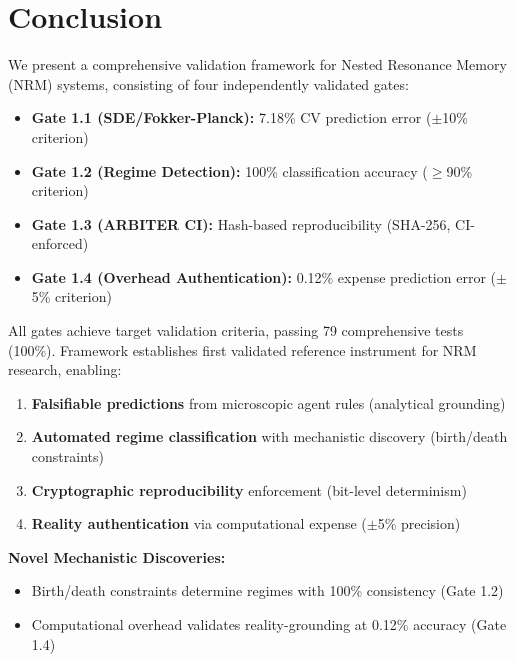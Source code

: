 \documentclass[11pt]{article}
\begin{document}

\section{Conclusion}

We present a comprehensive validation framework for Nested Resonance Memory (NRM) systems, consisting of four independently validated gates:

\begin{itemize}
\item \textbf{Gate 1.1 (SDE/Fokker-Planck):} 7.18\% CV prediction error ($\pm$10\% criterion)
\item \textbf{Gate 1.2 (Regime Detection):} 100\% classification accuracy ($\geq$90\% criterion)
\item \textbf{Gate 1.3 (ARBITER CI):} Hash-based reproducibility (SHA-256, CI-enforced)
\item \textbf{Gate 1.4 (Overhead Authentication):} 0.12\% expense prediction error ($\pm$5\% criterion)
\end{itemize}

All gates achieve target validation criteria, passing 79 comprehensive tests (100\%). Framework establishes first validated reference instrument for NRM research, enabling:

\begin{enumerate}
\item \textbf{Falsifiable predictions} from microscopic agent rules (analytical grounding)
\item \textbf{Automated regime classification} with mechanistic discovery (birth/death constraints)
\item \textbf{Cryptographic reproducibility} enforcement (bit-level determinism)
\item \textbf{Reality authentication} via computational expense ($\pm$5\% precision)
\end{enumerate}

\textbf{Novel Mechanistic Discoveries:}
\begin{itemize}
\item Birth/death constraints determine regimes with 100\% consistency (Gate 1.2)
\item Computational overhead validates reality-grounding at 0.12\% accuracy (Gate 1.4)
\end{itemize}
\end{document}
